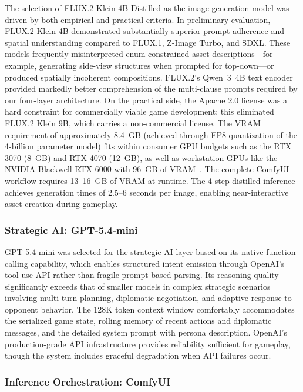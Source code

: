 \documentclass[conference]{IEEEtran}
\begin{document}
The selection of FLUX.2 Klein 4B Distilled as the image generation model was driven by both empirical and practical criteria. In preliminary evaluation, FLUX.2 Klein 4B demonstrated substantially superior prompt adherence and spatial understanding compared to FLUX.1, Z-Image Turbo, and SDXL. These models frequently misinterpreted enum-constrained asset descriptions---for example, generating side-view structures when prompted for top-down---or produced spatially incoherent compositions. FLUX.2's Qwen~3~4B text encoder provided markedly better comprehension of the multi-clause prompts required by our four-layer architecture. On the practical side, the Apache 2.0 license was a hard constraint for commercially viable game development; this eliminated FLUX.2 Klein 9B, which carries a non-commercial license. The VRAM requirement of approximately 8.4~GB (achieved through FP8 quantization of the 4-billion parameter model) fits within consumer GPU budgets such as the RTX 3070 (8~GB) and RTX 4070 (12~GB), as well as workstation GPUs like the NVIDIA Blackwell RTX 6000 with 96~GB of VRAM~\cite{nvidia2024blackwell}. The complete ComfyUI workflow requires 13--16~GB of VRAM at runtime. The 4-step distilled inference achieves generation times of 2.5--6 seconds per image, enabling near-interactive asset creation during gameplay.

\subsubsection{Strategic AI: GPT-5.4-mini}

GPT-5.4-mini was selected for the strategic AI layer based on its native function-calling capability, which enables structured intent emission through OpenAI's tool-use API rather than fragile prompt-based parsing. Its reasoning quality significantly exceeds that of smaller models in complex strategic scenarios involving multi-turn planning, diplomatic negotiation, and adaptive response to opponent behavior. The 128K token context window comfortably accommodates the serialized game state, rolling memory of recent actions and diplomatic messages, and the detailed system prompt with persona description. OpenAI's production-grade API infrastructure provides reliability sufficient for gameplay, though the system includes graceful degradation when API failures occur.

\subsubsection{Inference Orchestration: ComfyUI}
\end{document}
